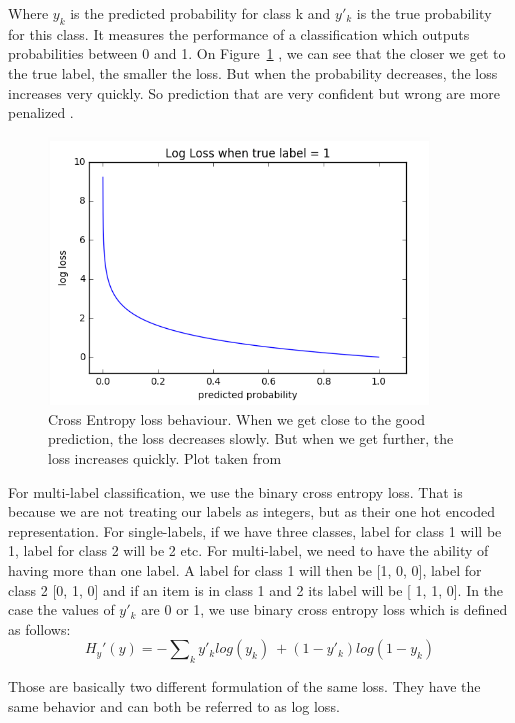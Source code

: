 Where \(y_k\) is the predicted probability for class k and \(y'_k\) is the true probability for this class. It measures the performance of a classification which outputs probabilities between 0 and 1. On  Figure~\ref{fig:CE} , we can see that the closer we get to the true label, the smaller the loss. But when the probability decreases, the loss increases very quickly. So prediction that are very confident but wrong are more penalized \cite{nnbook}.
\begin{figure}[!htp]
    \centering
        \includegraphics[width=0.9\textwidth]{figures/02-cross_entropy}
        \caption[Cross Entropy loss behaviour]{Cross Entropy loss behaviour. When we get close to the good prediction, the loss decreases slowly. But when we get further, the loss increases quickly. Plot taken from \cite{celoss}}
        \label{fig:CE}
\end{figure}


For multi-label classification, we use the binary cross entropy loss. That is because we are not treating our labels as integers, but as their one hot encoded representation. For single-labels, if we have three classes, label for class 1 will be 1, label for class 2 will be 2 etc.  For multi-label, we need to have the ability of having more than one label. A label for class 1 will then be [1, 0, 0], label for class 2 [0, 1, 0] and if an item is in class 1 and 2 its label will be [ 1, 1, 0]. In the case the values of \(y'_k\) are 0 or 1, we use binary cross entropy loss which is defined as follows: 
\begin{equation}
    H_y'(y) = - \sum\nolimits_k y'_k log(y_k)\ + (1 - y'_k)log(1 - y_k)
\end{equation}


Those are basically two different formulation of the same loss. They have the same behavior and can both be referred to as log loss. 
